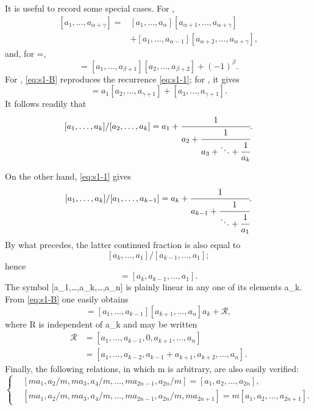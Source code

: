 \documentclass[
  paper=b5,
  fontsize=13pt,
  twoside,
  headings=normal,
  bookmarkpackage=false
]{scrartcl}
\theoremstyle{stieltjesplain}
\theoremstyle{stieltjesdefinition}
\def\({}\def\){}%
\def\frac#1#2{#1/#2}%
\begin{document}
It is useful to record some special cases. For \(\),
\begin{equation}
 \begin{split}
 [a_1,\ldots,a_{\alpha+\gamma}]
 ={}&[a_1,\ldots,a_\alpha][a_{\alpha+1},\ldots,a_{\alpha+\gamma}]\\
 &+[a_1,\ldots,a_{\alpha-1}]
   [a_{\alpha+2},\ldots,a_{\alpha+\gamma}],
 \end{split}
 \tag{B}\label{eq:s1-B}
\end{equation}
and, for \(\alpha=\),
\begin{equation}
 [a_1,\ldots,a_{\beta+2}][a_2,\ldots,a_{\beta+1}]
 =[a_1,\ldots,a_{\beta+1}][a_2,\ldots,a_{\beta+2}]+(-1)^\beta.
 \tag{C}\label{eq:s1-C}
\end{equation}
For \(\), \eqref{eq:s1-B} reproduces the recurrence
\eqref{eq:s1-1}; for \(\), it gives
\begin{equation}
 [a_1,\ldots,a_{\gamma+1}]
 =a_1[a_2,\ldots,a_{\gamma+1}]+[a_3,\ldots,a_{\gamma+1}].
 \tag{6}\label{eq:s1-6}
\end{equation}
It follows readily that
\[
 \frac{[a_1,\ldots,a_k]}{[a_2,\ldots,a_k]}
 =a_1+\cfrac{1}{a_2+
  \cfrac{1}{a_3+\ddots+
   \cfrac{1}{a_k}}}.
\]

On the other hand, \eqref{eq:s1-1} gives
\[
 \frac{[a_1,\ldots,a_k]}{[a_1,\ldots,a_{k-1}]}
 =a_k+\cfrac{1}{a_{k-1}+
  \cfrac{1}{\ddots+
   \cfrac{1}{a_1}}}.
\]
By what precedes, the latter continued fraction is also equal to
\[
 \frac{[a_k,\ldots,a_1]}{[a_{k-1},\ldots,a_1]};
\]
hence
\begin{equation}
 [a_1,a_2,\ldots,a_k]=[a_k,a_{k-1},\ldots,a_1].
 \tag{7}\label{eq:s1-7}
\end{equation}
The symbol \([a_1,\ldots,a_k,\ldots,a_n]\) is plainly linear in any one
of its elements \(a_k\). From \eqref{eq:s1-B} one easily obtains
\begin{equation}
 [a_1,\ldots,a_n]
 =[a_1,\ldots,a_{k-1}][a_{k+1},\ldots,a_n]a_k+\mathcal R,
 \tag{8}\label{eq:s1-8}
\end{equation}
where \(\mathcal R\) is independent of \(a_k\) and may be written
\[
 \begin{split}
 \mathcal R
 &=[a_1,\ldots,a_{k-1},0,a_{k+1},\ldots,a_n]\\
 &=[a_1,\ldots,a_{k-2},a_{k-1}+a_{k+1},a_{k+2},\ldots,a_n].
 \end{split}
\]
Finally, the following relations, in which \(m\) is arbitrary, are also
easily verified:
\begin{equation}
 \left\{
 \begin{aligned}
 &[ma_1,a_2/m,ma_3,a_4/m,\ldots,ma_{2n-1},a_{2n}/m]
   =[a_1,a_2,\ldots,a_{2n}],\\
 &[ma_1,a_2/m,ma_3,a_4/m,\ldots,ma_{2n-1},a_{2n}/m,ma_{2n+1}]
   =m[a_1,a_2,\ldots,a_{2n+1}].
 \end{aligned}\right.
 \tag{9}\label{eq:s1-9}
\end{equation}
\end{document}
